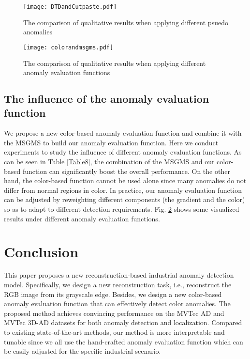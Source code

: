 \documentclass[5p, twocolumn]{elsarticle}[draft]
\begin{document}
\begin{figure}
    \centering
		\texttt{[image: DTDandCutpaste.pdf]}
	\caption{The comparison of qualitative results when applying different psuedo anomalies}
	\label{FIG:5}
\end{figure}

\begin{figure}
    \centering
		\texttt{[image: colorandmsgms.pdf]}
	\caption{The comparison of qualitative results when applying different anomaly evaluation functions}
	\label{FIG:6}
\end{figure}

\subsection{The influence of the anomaly evaluation function}
We propose a new color-based anomaly evaluation function and combine it with the MSGMS to build our anomaly evaluation function. Here we conduct experiments to study the influence of different anomaly evaluation functions. As can be seen in Table \ref{Table8}, the combination of the MSGMS and our color-based function can significantly boost the overall performance. On the other hand, the color-based function cannot be used alone since many anomalies do not differ from normal regions in color. In practice, our anomaly evaluation function can be adjusted by reweighting different components (the gradient and the color) so as to adapt to different detection requirements. Fig. \ref{FIG:6} shows some visualized results under different anomaly evaluation functions.




\section{Conclusion}
This paper proposes a new reconstruction-based industrial anomaly detection model. Specifically, we design a new reconstruction task, i.e., reconstruct the RGB image from its grayscale edge. Besides, we design a new color-based anomaly evaluation function that can effectively detect color anomalies. The proposed method achieves convincing performance on the MVTec AD and MVTec 3D-AD datasets for both anomaly detection and localization. Compared to existing state-of-the-art methods, our method is more interpretable and tunable since we all use the hand-crafted anomaly evaluation function which can be easily adjusted for the specific industrial scenario.
\end{document}
